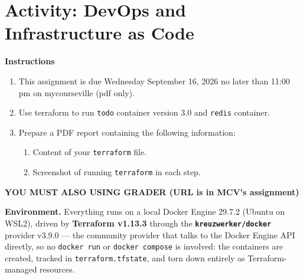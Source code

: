 \documentclass[a4paper, 10pt]{article}
\begin{document}
\subject
{}

\section*{Activity: DevOps and Infrastructure as Code}

\textbf{Instructions}
\begin{enumerate}
	\item This assignment is due Wednesday September 16, 2026 no later than 11:00 pm on mycourseville (pdf only).
	\item Use {terraform} to run \texttt{todo} container version 3.0 and \texttt{redis} container.
	\item Prepare a PDF report containing the following information:
	      \begin{enumerate}
		      \item Content of your \texttt{terraform} file.
		      \item Screenshot of running \texttt{terraform} in each step.
	      \end{enumerate}
\end{enumerate}

\begin{center}
	\par\noindent\textbf{\color{red} YOU MUST ALSO USING GRADER (URL is in MCV's assignment)}
\end{center}

\newpage

\noindent\textbf{Environment.}
Everything runs on a local Docker Engine 29.7.2 (Ubuntu on WSL2), driven by
\textbf{Terraform v1.13.3} through the \textbf{\texttt{kreuzwerker/\allowbreak docker}}
provider v3.9.0 --- the community provider that talks to the Docker Engine API
directly, so no \texttt{docker run} or \texttt{docker compose} is involved: the
containers are created, tracked in \texttt{terraform.tfstate}, and torn down
entirely as Terraform-managed resources.

\medskip
\end{document}

